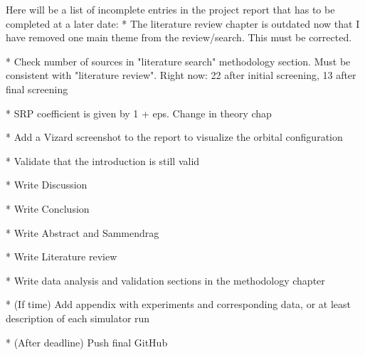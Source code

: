 Here will be a list of incomplete entries in the project report that has to be completed at a later date:
* The literature review chapter is outdated now that I have removed one main theme from the review/search. This must be corrected. 

* Check number of sources in "literature search" methodology section. Must be consistent with "literature review". Right now: 22 after initial screening, 13 after final screening

* SRP coefficient is given by 1 + eps. Change in theory chap

* Add a Vizard screenshot to the report to visualize the orbital configuration

* Validate that the introduction is still valid

* Write Discussion

* Write Conclusion

* Write Abstract and Sammendrag

* Write Literature review

* Write data analysis and validation sections in the methodology chapter

* (If time) Add appendix with experiments and corresponding data, or at least description of each simulator run

* (After deadline) Push final GitHub